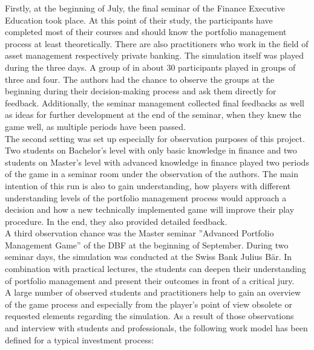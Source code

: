 Firstly, at the beginning of July, the final seminar of the Finance Executive Education took place. At this point of their study, the participants have completed most of their courses and should know the portfolio management process at least theoretically. There are also practitioners who work in the field of asset management respectively private banking. The simulation itself was played during the three days. A group of in about 30 participants played in groups of three and four. The authors had the chance to observe the groups at the beginning during their decision-making process and ask them directly for feedback. Additionally, the seminar management collected final feedbacks as well as ideas for further development at the end of the seminar, when they knew the game well, as multiple periods have been passed. \\

The second setting was set up especially for observation purposes of this project. Two students on Bachelor’s level with only basic knowledge in finance and two students on Master’s level with advanced knowledge in finance played two periods of the game in a seminar room under the observation of the authors. The main intention of this run is also to gain understanding, how players with different understanding levels of the portfolio management process would approach a decision and how a new technically implemented game will improve their play procedure. In the end, they also provided detailed feedback. \\

A third observation chance was the Master seminar ''Advanced Portfolio Management Game'' of the DBF at the beginning of September. During two seminar days, the simulation was conducted at the Swiss Bank Julius Bär. In combination with practical lectures, the students can deepen their understanding of portfolio management and present their outcomes in front of a critical jury. \\

A large number of observed students and practitioners help to gain an overview of the game process and especially from the player’s point of view obsolete or requested elements regarding the simulation. As a result of those observations and interview with students and professionals, the following work model has been defined for a typical investment process: \\

